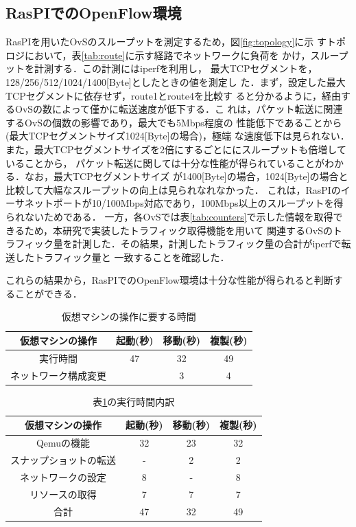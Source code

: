 \documentclass[submit,techrep]{ipsj}
\begin{document}
\subsection{RasPIでのOpenFlow環境}
RasPIを用いたOvSのスループットを測定するため，図\ref{fig:topology}に示
すトポロジにおいて，表\ref{tab:route}に示す経路でネットワークに負荷を
かけ，スループットを計測する．この計測にはiperf\cite{iperf}を利用し，
最大TCPセグメントを，128/256/512/1024/1400[Byte]としたときの値を測定し
た．まず，設定した最大TCPセグメントに依存せず，route1とroute4を比較す
ると分かるように，経由するOvSの数によって僅かに転送速度が低下する．こ
れは，パケット転送に関連するOvSの個数の影響であり，最大でも5Mbps程度の
性能低下であることから(最大TCPセグメントサイズ1024[Byte]の場合)，極端
な速度低下は見られない．
また，最大TCPセグメントサイズを2倍にするごとににスループットも倍増していることから，
パケット転送に関しては十分な性能が得られていることがわかる．なお，最大TCPセグメントサイズ
が1400[Byte]の場合，1024[Byte]の場合と比較して大幅なスループットの向上は見られなれなかった．
これは，RasPIのイーサネットポートが10/100Mbps対応であり，100Mbps以上のスループットを得られないためである．
一方，各OvSでは表\ref{tab:counters}で示した情報を取得できるため，本研究で実装したトラフィック取得機能を用いて
関連するOvSのトラフィック量を計測した．その結果，計測したトラフィック量の合計がiperfで転送したトラフィック量と
一致することを確認した．

これらの結果から，RasPIでのOpenFlow環境は十分な性能が得られると判断することができる．

\begin{table}[tb]
	\centering
	\caption{仮想マシンの操作に要する時間}
	\label{tab:func_time}
	\vspace{4mm}
    \scalebox{1.0}
	{
		\begin{tabular}{|c|c|c|c|} \hline
            仮想マシンの操作& 起動(秒) & 移動(秒) & 複製(秒) \\ \hline \hline
            実行時間 & 47 & 32 & 49 \\ \hline
            ネットワーク構成変更 & & 3 & 4 \\ \hline
	  	\end{tabular}
	}
\end{table}

\begin{table}[tb]
	\centering
	\caption{表\ref{tab:func_time}の実行時間内訳}
	\label{tab:func_breakdown}
	\vspace{4mm}
    \scalebox{1.0}
	{
		\begin{tabular}{|c|c|c|c|} \hline
            仮想マシンの操作& 起動(秒) & 移動(秒) & 複製(秒) \\ \hline \hline
						Qemuの機能 & 32 & 23 & 32 \\ \hline
						スナップショットの転送 & - & 2 & 2 \\ \hline
						ネットワークの設定 & 8 & - & 8 \\ \hline
						リソースの取得 & 7 & 7 & 7 \\ \hline
            合計 & 47 & 32 & 49 \\ \hline
	  	\end{tabular}
	}
\end{table}
\end{document}
